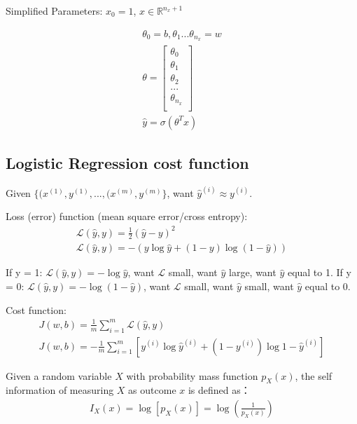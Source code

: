 Simplified Parameters:
	$x_0 = 1$, $x \in \mathbb{R}^{{n_x} + 1}$

\begin{align}
	\theta_0 = b, \theta_1 ... \theta_{n_x} = w \\
	\theta = \begin{bmatrix} 
				\theta_0 \\
				\theta_1 \\
				\theta_2 \\
				...      \\
				\theta_{n_x} \\
	         \end{bmatrix} \\
	\hat{y} = \sigma{(\theta^Tx)}
\end{align}


\subsection{Logistic Regression cost function}

Given $\{ (x^{(1)}, y^{(1)}, ..., (x^{(m)}, y^{(m)} \}$,
want $\hat{y}^{(i)} \approx {y}^{(i)}$.

Loss (error) function (mean square error/cross entropy):
\begin{align}
	\mathcal{L}(\hat{y}, y) = \frac{1}{2}(\hat{y} - y)^2  \\
	\mathcal{L}(\hat{y}, y) = -(y\log{\hat{y}} + (1-y)\log(1 - \hat{y}))
\end{align}

If y = 1: $\mathcal{L}(\hat{y}, y) = -\log{\hat{y}}$, 
want $\mathcal{L}$ small, want $\hat{y}$ large, want $\hat{y}$ equal to 1.  
If y = 0: $\mathcal{L}(\hat{y}, y) = -\log{(1 - \hat{y})}$,
want $\mathcal{L}$ small, want $\hat{y}$ small, want  $\hat{y}$ equal to 0. 


Cost function:
\begin{align}
	J(w, b) = \frac{1}{m} \displaystyle\sum_{i=1}^m \mathcal{L}(\hat{y}, y) \\
	J(w, b) = - \frac{1}{m} \displaystyle\sum_{i=1}^m [y^{(i)}\log{\hat{y}^{(i)}} + (1 - y^{(i)})\log{1 - \hat{y}^{(i)}}]
\end{align}

Given a random variable $X$ with probability mass function $p_X(x)$, 
the self information of measuring $X$ as outcome $x$ is defined as：
\begin{align}
	I_X(x) = \log[p_X(x)] = \log(\frac{1}{p_X(x)})
\end{align}

